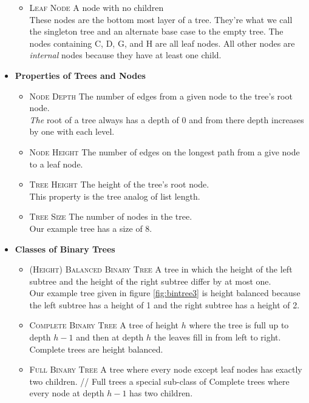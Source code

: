 \documentclass[]{tufte-handout}
\begin{document}
\begin{itemize}
\begin{itemize}
\item \textsc{Leaf Node} A node with no children \\
These nodes are the bottom most layer of a tree. They're what we call the singleton tree and an alternate base case to the empty tree. The nodes containing C, D, G, and H are all leaf nodes. All other nodes are \textit{internal} nodes because they have at least one child.
\end{itemize}
\item \textbf{Properties of Trees and Nodes}
\begin{itemize}
\item \textsc{Node Depth} The number of edges from a given node to the tree's root node. \\
\textit{The} root of a tree always has a depth of 0 and from there depth increases by one with each level. 
\item \textsc{Node Height} The number of edges on the longest path from a give node to a leaf node.
\item \textsc{Tree Height} The height of the tree's root node. \\
This property is the tree analog of list length.
\item \textsc{Tree Size} The number of nodes in the tree. \\
Our example tree has a size of 8.
\end{itemize}
\item \textbf{Classes of Binary Trees}
\begin{itemize}
\item \textsc{(Height) Balanced Binary Tree} A tree in which the height of the left subtree and the height of the right subtree differ by at most one. \\
Our example tree given in figure \ref{fig:bintree3} is height balanced because the left subtree has a height of 1 and the right subtree has a height of 2. 
\item \textsc{Complete Binary Tree} A tree of height $h$ where the tree is full up to depth $h-1$ and then at depth $h$ the leaves fill in from left to right. \\
Complete trees are height balanced.
\item \textsc{Full Binary Tree} A tree where every node except leaf nodes has exactly two children. //
Full trees a special sub-class of Complete trees where every node at depth $h-1$ has two children.
\end{itemize}
\end{itemize}
\end{document}

